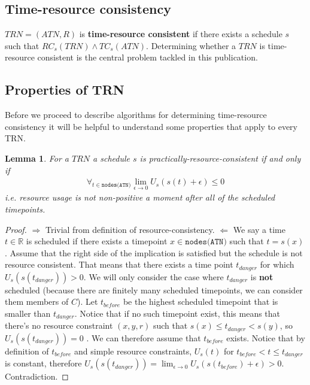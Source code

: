 \documentclass{article}
\newtheorem{lemma}[theorem]{Lemma}
\begin{document}
\begin{multicols}{2}
\subsection{Time-resource consistency}
$TRN=(ATN, R)$ is \textbf{time-resource consistent} if there exists a schedule $s$ such that $RC_s(TRN) \wedge TC_s(ATN)$. Determining whether a $TRN$ is time-resource consistent is the central problem tackled in this publication.

\subsection{Properties of TRN}
Before we proceed to describe algorithms for determining time-resource consistency it will be helpful to understand some properties that apply to every TRN.
\begin{lemma}
\label{resource_checking}
For a $TRN$ a schedule $s$ is practically-resource-consistent if and only if
\begin{align}
\label{eq:resource_consistency}\forall_{t \in \texttt{nodes(ATN)}} \lim_{\epsilon \to 0} U_s(s(t) + \epsilon) \leq 0
\end{align}
i.e. resource usage is not non-positive a moment after all of the scheduled timepoints.
\end{lemma}
\begin{proof}
$\Rightarrow$ Trivial from definition of resource-consistency.
$\Leftarrow$ We say a time $t \in \mathbb{R}$ is scheduled if there exists a timepoint  $x \in \texttt{nodes(ATN)}$ such that $t = s(x)$. Assume that the right side of the implication is satisfied but the schedule is not resource consistent. That means that there exists a time point $t_{danger}$ for which $U_s(s(t_{danger})) > 0 $. We will only consider the case where $t_{danger}$ is \textbf{not} scheduled (because there are finitely many scheduled timepoints, we can consider them members of $C$). Let $t_{before}$ be the highest scheduled timepoint that is smaller than $t_{danger}$. Notice that if no such timepoint exist, this means that there's no resource constraint $(x,y,r)$ such that $s(x) \leq t_{danger} < s(y)$, so $U_s(s(t_{danger}))=0 $ . We can therefore assume that $t_{before}$ exists. Notice that by definition of $t_{before}$ and simple resource constraints, $U_s(t)$ for $t_{before} < t \leq t_{danger}$ is constant, therefore $U_s(s(t_{danger})) = \lim_{\epsilon \to 0} U_s(s(t_{before}) + \epsilon) > 0$. Contradiction.


\end{proof}
\end{multicols}
\end{document}
